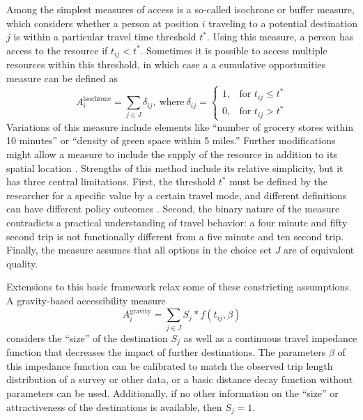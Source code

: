 \documentclass[ijerph,article,submit,moreauthors,pdftex]{mdpi}
\begin{document}
Among the simplest measures of access is a so-called isochrone or buffer measure, which
considers whether a person at position \(i\) traveling to a potential destination
\(j\) is within a particular travel time threshold \(t^*\). Using this measure, a
person has access to the resource if \(t_{ij} < t^*\). Sometimes it is
possible to access multiple resources within this threshold, in which case a
a cumulative opportunities measure can be defined as
\begin{equation}
  A_i^{\mathrm{isochrone}} = \sum_{j \in J} \delta_{ij}, 
  \mathrm{\ where\ } \delta_{ij} = 
  \begin{cases}
    1, & \text{for } t_{ij} \leq t^*\\
    0, & \text{for } t_{ij} > t^*
  \end{cases} 
  \label{eq:isochrone}
\end{equation}
Variations of this measure include elements like ``number of grocery stores
within 10 minutes'' or ``density of green space within 5 miles.'' Further modifications
might allow a measure to include the supply of the resource in addition to its
spatial location \citep{kiani2021different}. Strengths of
this method include its relative simplicity, but it has three central limitations. First,
the threshold \(t^*\) must be defined by the researcher for a specific value by
a certain travel mode, and different definitions
can have different policy outcomes \citep{logan2019}. Second, the binary nature of the
measure contradicts a practical understanding of travel behavior: a four minute and fifty second
trip is not functionally different from a five minute and ten second trip. Finally,
the measure assumes that all options in the choice set \(J\) are of equivalent
quality.

Extensions to this basic framework relax some of these constricting assumptions.
A gravity-based accessibility measure
\begin{equation}
  A_i^{\mathrm{gravity}} = \sum_{j \in J} S_j * f(t_{ij}, \beta)
  \label{eq:gravity}
\end{equation}
considers the ``size'' of the destination \(S_j\) as well as a continuous travel
impedance function that decreases the impact of further destinations. The parameters
\(\beta\) of this impedance function can be calibrated to match the observed trip length
distribution of a survey or other data, or a basic distance decay function without
parameters can be used. Additionally, if no other information on the ``size'' or
attractiveness of the destinations is available, then \(S_j = 1\).
\end{document}
